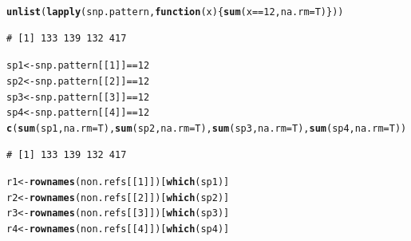 \documentclass{article}\usepackage[]{graphicx}\usepackage[]{color}
\makeatletter
\newcommand{\hlnum}[1]{\textcolor[rgb]{0.686,0.059,0.569}{#1}}%
\newcommand{\hlopt}[1]{\textcolor[rgb]{0,0,0}{#1}}%
\newcommand{\hlstd}[1]{\textcolor[rgb]{0.345,0.345,0.345}{#1}}%
\newcommand{\hlkwa}[1]{\textcolor[rgb]{0.161,0.373,0.58}{\textbf{#1}}}%
\newcommand{\hlkwb}[1]{\textcolor[rgb]{0.69,0.353,0.396}{#1}}%
\newcommand{\hlkwc}[1]{\textcolor[rgb]{0.333,0.667,0.333}{#1}}%
\newcommand{\hlkwd}[1]{\textcolor[rgb]{0.737,0.353,0.396}{\textbf{#1}}}%
\newenvironment{kframe}{%
 \def\at@end@of@kframe{}%
 \ifinner\ifhmode%
  \def\at@end@of@kframe{\end{minipage}}%
  \begin{minipage}{\columnwidth}%
 \fi\fi%
 \def\FrameCommand##1{\hskip\@totalleftmargin \hskip-\fboxsep
 \colorbox{shadecolor}{##1}\hskip-\fboxsep
     \hskip-\linewidth \hskip-\@totalleftmargin \hskip\columnwidth}%
 \MakeFramed {\advance\hsize-\width
   \@totalleftmargin\z@ \linewidth\hsize
   \@setminipage}}%
 {\par\unskip\endMakeFramed%
 \at@end@of@kframe}
\newenvironment{knitrout}{}{} %
\makeatother
\begin{document}
\begin{knitrout}\footnotesize
{}\color{fgcolor}\begin{kframe}
\begin{alltt}
\hlkwd{unlist}\hlstd{(}\hlkwd{lapply}\hlstd{(snp.pattern,}\hlkwa{function}\hlstd{(}\hlkwc{x}\hlstd{)\{}\hlkwd{sum}\hlstd{(x}\hlopt{==}\hlnum{12}\hlstd{,}\hlkwc{na.rm}\hlstd{=T)\}))}
\end{alltt}
\begin{verbatim}
# [1] 133 139 132 417
\end{verbatim}
\begin{alltt}
\hlstd{sp1} \hlkwb{<-} \hlstd{snp.pattern[[}\hlnum{1}\hlstd{]]}\hlopt{==}\hlnum{12}
\hlstd{sp2} \hlkwb{<-} \hlstd{snp.pattern[[}\hlnum{2}\hlstd{]]}\hlopt{==}\hlnum{12}
\hlstd{sp3} \hlkwb{<-} \hlstd{snp.pattern[[}\hlnum{3}\hlstd{]]}\hlopt{==}\hlnum{12}
\hlstd{sp4} \hlkwb{<-} \hlstd{snp.pattern[[}\hlnum{4}\hlstd{]]}\hlopt{==}\hlnum{12}
\hlkwd{c}\hlstd{(}\hlkwd{sum}\hlstd{(sp1,}\hlkwc{na.rm}\hlstd{=T),} \hlkwd{sum}\hlstd{(sp2,}\hlkwc{na.rm}\hlstd{=T),} \hlkwd{sum}\hlstd{(sp3,}\hlkwc{na.rm}\hlstd{=T),} \hlkwd{sum}\hlstd{(sp4,}\hlkwc{na.rm}\hlstd{=T))}
\end{alltt}
\begin{verbatim}
# [1] 133 139 132 417
\end{verbatim}
\begin{alltt}
\hlstd{r1} \hlkwb{<-} \hlkwd{rownames}\hlstd{(non.refs[[}\hlnum{1}\hlstd{]])[}\hlkwd{which}\hlstd{(sp1)]}
\hlstd{r2} \hlkwb{<-} \hlkwd{rownames}\hlstd{(non.refs[[}\hlnum{2}\hlstd{]])[}\hlkwd{which}\hlstd{(sp2)]}
\hlstd{r3} \hlkwb{<-} \hlkwd{rownames}\hlstd{(non.refs[[}\hlnum{3}\hlstd{]])[}\hlkwd{which}\hlstd{(sp3)]}
\hlstd{r4} \hlkwb{<-} \hlkwd{rownames}\hlstd{(non.refs[[}\hlnum{4}\hlstd{]])[}\hlkwd{which}\hlstd{(sp4)]}


\end{alltt}
\end{kframe}
\end{knitrout}
\end{document}
